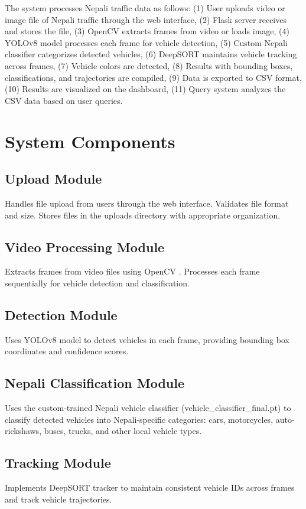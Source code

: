 \documentclass[12pt,a4paper]{report}
\begin{document}
The system processes Nepali traffic data as follows: (1) User uploads video or image file of Nepali traffic through the web interface, (2) Flask server receives and stores the file, (3) OpenCV extracts frames from video or loads image, (4) YOLOv8 model processes each frame for vehicle detection, (5) Custom Nepali classifier categorizes detected vehicles, (6) DeepSORT maintains vehicle tracking across frames, (7) Vehicle colors are detected, (8) Results with bounding boxes, classifications, and trajectories are compiled, (9) Data is exported to CSV format, (10) Results are visualized on the dashboard, (11) Query system analyzes the CSV data based on user queries.

\section{System Components}

\subsection{Upload Module}
Handles file upload from users through the web interface. Validates file format and size. Stores files in the uploads directory with appropriate organization.

\subsection{Video Processing Module}
Extracts frames from video files using OpenCV \cite{opencv2000the}. Processes each frame sequentially for vehicle detection and classification.

\subsection{Detection Module}
Uses YOLOv8 model \cite{redmon2016yolo, ultralytics2023yolov8} to detect vehicles in each frame, providing bounding box coordinates and confidence scores.

\subsection{Nepali Classification Module}
Uses the custom-trained Nepali vehicle classifier (vehicle\_classifier\_final.pt) to classify detected vehicles into Nepali-specific categories: cars, motorcycles, auto-rickshaws, buses, trucks, and other local vehicle types.

\subsection{Tracking Module}
Implements DeepSORT tracker \cite{bewley2016deepsort} to maintain consistent vehicle IDs across frames and track vehicle trajectories.
\end{document}
